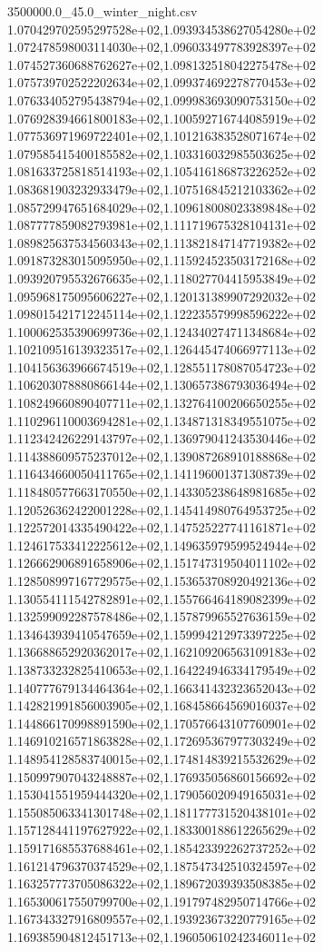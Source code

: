 \begin{filecontents*}{3500000.0_45.0_winter_night.csv}
1.070429702595297528e+02,1.093934538627054280e+02
1.072478598003114030e+02,1.096033497783928397e+02
1.074527360688762627e+02,1.098132518042275478e+02
1.075739702522202634e+02,1.099374692278770453e+02
1.076334052795438794e+02,1.099983693090753150e+02
1.076928394661800183e+02,1.100592716744085919e+02
1.077536971969722401e+02,1.101216383528071674e+02
1.079585415400185582e+02,1.103316032985503625e+02
1.081633725818514193e+02,1.105416186873226252e+02
1.083681903232933479e+02,1.107516845212103362e+02
1.085729947651684029e+02,1.109618008023389848e+02
1.087777859082793981e+02,1.111719675328104131e+02
1.089825637534560343e+02,1.113821847147719382e+02
1.091873283015095950e+02,1.115924523503172168e+02
1.093920795532676635e+02,1.118027704415953849e+02
1.095968175095606227e+02,1.120131389907292032e+02
1.098015421712245114e+02,1.122235579998596222e+02
1.100062535390699736e+02,1.124340274711348684e+02
1.102109516139323517e+02,1.126445474066977113e+02
1.104156363966674519e+02,1.128551178087054723e+02
1.106203078880866144e+02,1.130657386793036494e+02
1.108249660890407711e+02,1.132764100206650255e+02
1.110296110003694281e+02,1.134871318349551075e+02
1.112342426229143797e+02,1.136979041243530446e+02
1.114388609575237012e+02,1.139087268910188868e+02
1.116434660050411765e+02,1.141196001371308739e+02
1.118480577663170550e+02,1.143305238648981685e+02
1.120526362422001228e+02,1.145414980764953725e+02
1.122572014335490422e+02,1.147525227741161871e+02
1.124617533412225612e+02,1.149635979599524944e+02
1.126662906891658906e+02,1.151747319504011102e+02
1.128508997167729575e+02,1.153653708920492136e+02
1.130554111542782891e+02,1.155766464189082399e+02
1.132599092287578486e+02,1.157879965527636159e+02
1.134643939410547659e+02,1.159994212973397225e+02
1.136688652920362017e+02,1.162109206563109183e+02
1.138733232825410653e+02,1.164224946334179549e+02
1.140777679134464364e+02,1.166341432323652043e+02
1.142821991856003905e+02,1.168458664569016037e+02
1.144866170998891590e+02,1.170576643107760901e+02
1.146910216571863828e+02,1.172695367977303249e+02
1.148954128583740015e+02,1.174814839215532629e+02
1.150997907043248887e+02,1.176935056860156692e+02
1.153041551959444320e+02,1.179056020949165031e+02
1.155085063341301748e+02,1.181177731520438101e+02
1.157128441197627922e+02,1.183300188612265629e+02
1.159171685537688461e+02,1.185423392262737252e+02
1.161214796370374529e+02,1.187547342510324597e+02
1.163257773705086322e+02,1.189672039393508385e+02
1.165300617550799700e+02,1.191797482950714766e+02
1.167343327916809557e+02,1.193923673220779165e+02
1.169385904812451713e+02,1.196050610242346011e+02

\end{filecontents*}
